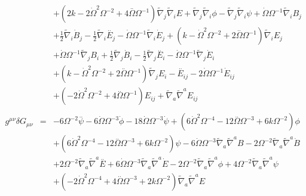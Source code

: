 \begin{eqnarray}
\nonumber\\
&&+ (2 k - 2 \dot{\Omega}^2 \Omega^{-2} + 4 \overset{..}{\Omega} \Omega^{-1}) \tilde{\nabla}_{j}\tilde{\nabla}_{i}E + \tilde{\nabla}_{j}\tilde{\nabla}_{i}\phi -  \tilde{\nabla}_{j}\tilde{\nabla}_{i}\psi +\dot{\Omega} \Omega^{-1} \tilde{\nabla}_{i}B_{j} \nonumber \\ 
&& + \tfrac{1}{2} \tilde{\nabla}_{i}\dot{B}_{j} -  \tfrac{1}{2} \tilde{\nabla}_{i}\overset{..}{E}_{j} -  \dot{\Omega} \Omega^{-1} \tilde{\nabla}_{i}\dot{E}_{j} + (k -  \dot{\Omega}^2 \Omega^{-2} + 2 \overset{..}{\Omega} \Omega^{-1}) \tilde{\nabla}_{i}E_{j} 
\nonumber\\
&&+ \dot{\Omega} \Omega^{-1} \tilde{\nabla}_{j}B_{i} + \tfrac{1}{2} \tilde{\nabla}_{j}\dot{B}_{i} -  \tfrac{1}{2} \tilde{\nabla}_{j}\overset{..}{E}_{i} -  \dot{\Omega} \Omega^{-1} \tilde{\nabla}_{j}\dot{E}_{i} 
\nonumber\\
&&+ (k -  \dot{\Omega}^2 \Omega^{-2} + 2 \overset{..}{\Omega} \Omega^{-1}) \tilde{\nabla}_{j}E_{i}- \overset{..}{E}_{ij} - 2 \dot{\Omega} \Omega^{-1} \dot{E}_{ij} \nonumber \\ 
&& + (-2 \dot{\Omega}^2 \Omega^{-2} + 4 \overset{..}{\Omega} \Omega^{-1}) E_{ij} + \tilde{\nabla}_{a}\tilde{\nabla}^{a}E_{ij}
\\  \nonumber\\ 
g^{\mu\nu}\delta G_{\mu\nu}&=& -6 \Omega^{-2} \overset{..}{\psi} - 6 \dot{\Omega} \Omega^{-3} \dot{\phi} - 18 \dot{\Omega} \Omega^{-3} \dot{\psi} + (6 \dot{\Omega}^2 \Omega^{-4} - 12 \overset{..}{\Omega} \Omega^{-3} + 6 k \Omega^{-2}) \phi \nonumber \\ 
&& + (6 \dot{\Omega}^2 \Omega^{-4} - 12 \overset{..}{\Omega} \Omega^{-3} + 6 k \Omega^{-2}) \psi - 6 \dot{\Omega} \Omega^{-3} \tilde{\nabla}_{a}\tilde{\nabla}^{a}B - 2 \Omega^{-2} \tilde{\nabla}_{a}\tilde{\nabla}^{a}\dot{B} 
\nonumber\\
&&+ 2 \Omega^{-2} \tilde{\nabla}_{a}\tilde{\nabla}^{a}\overset{..}{E}  + 6 \dot{\Omega} \Omega^{-3} \tilde{\nabla}_{a}\tilde{\nabla}^{a}\dot{E} - 2 \Omega^{-2} \tilde{\nabla}_{a}\tilde{\nabla}^{a}\phi + 4 \Omega^{-2} \tilde{\nabla}_{a}\tilde{\nabla}^{a}\psi 
\nonumber\\
&&+ (-2 \dot{\Omega}^2 \Omega^{-4} + 4 \overset{..}{\Omega} \Omega^{-3} + 2 k \Omega^{-2}) \tilde{\nabla}_{a}\tilde{\nabla}^{a}E 
\end{eqnarray}


